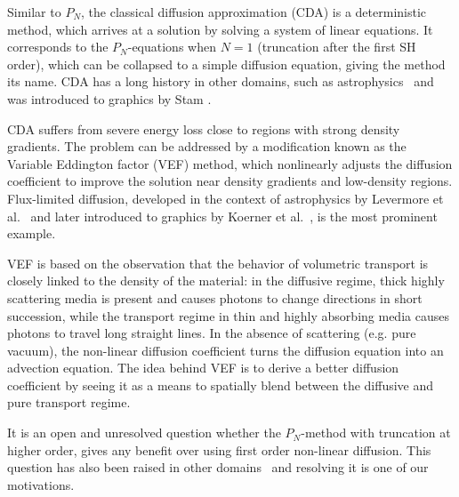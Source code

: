 Similar to $P_N$, the classical diffusion approximation (CDA) is a deterministic method, which arrives at a solution by solving a system of linear equations. It corresponds to the $P_N$-equations when $N=1$ (truncation after the first SH order), which can be collapsed to a simple diffusion equation, giving the method its name. CDA has a long history in other domains, such as astrophysics~\cite{Ishimaru78} and was introduced to graphics by Stam \cite{Stam95}.

CDA suffers from severe energy loss close to regions with strong density gradients. The problem can be addressed by a modification known as the Variable Eddington factor (VEF) method, which nonlinearly adjusts the diffusion coefficient to improve the solution near density gradients and low-density regions. Flux-limited diffusion, developed in the context of astrophysics by Levermore et al.~\cite{Levermore81} and later introduced to graphics by Koerner et al.~\cite{Koerner14}, is the most prominent example.

VEF is based on the observation that the behavior of volumetric transport is closely linked to the density of the material: in the diffusive regime, thick highly scattering media is present and causes photons to change directions in short succession, while the transport regime in thin and highly absorbing media causes photons to travel long straight lines. In the absence of scattering (e.g. pure vacuum), the non-linear diffusion coefficient turns the diffusion equation into an advection equation. The idea behind VEF is to derive a better diffusion coefficient by seeing it as a means to spatially blend between the diffusive and pure transport regime.

It is an open and unresolved question whether the $P_N$-method with truncation at higher order, gives any benefit over using first order non-linear diffusion. This question has also been raised in other domains~\cite{Olson00} and resolving it is one of our motivations.

\vspace{1in}




